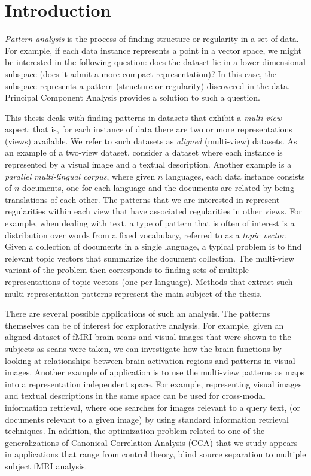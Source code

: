 %
\chapter{Introduction}

\emph{Pattern analysis} is the process of finding structure or regularity in a set of data. For example,
if each data instance represents a point in a vector space, we might be interested in the following question: does the dataset lie
in a lower dimensional subspace (does it admit a more compact representation)? In this case, the subspace represents a pattern (structure or regularity)
discovered in the data. Principal Component Analysis provides a solution to such a question.

This thesis deals with finding patterns in datasets that exhibit a \emph{multi-view} aspect: that is, for
each instance of data there are two or more representations (views) available. We refer to such datasets as
\emph{aligned} (multi-view) datasets. As an example of a two-view dataset, consider a dataset where each instance is represented by a visual image and
a textual description. Another example is a \emph{parallel multi-lingual corpus},
where given $n$ languages, each data instance consists of $n$ documents, one for each language and the documents are related by being
translations of each other. The patterns that we are interested in represent regularities within each view
that have associated regularities in other views. For example, when dealing with text, a type of pattern that is often of interest
is a distribution over words from a fixed vocabulary, referred to as a \emph{topic vector}. Given a collection of documents
in a single language, a typical problem is to find relevant topic vectors that summarize the document collection. The multi-view
variant of the problem then corresponds to finding sets of multiple representations of topic vectors (one per language).
Methods that extract such multi-representation patterns represent the main subject of the thesis.

There are several possible applications of such an analysis. The patterns themselves can be of interest
for explorative analysis. For example, given an aligned dataset of fMRI brain scans and visual images that were
shown to the subjects as scans were taken, we can investigate how the brain functions by looking at
relationships between brain activation regions and patterns in visual images.
Another example of application is to use the multi-view patterns as maps into a
representation independent space. For example, representing visual images and textual descriptions in the same
space can be used for cross-modal information retrieval, where one searches for images relevant to a query text,
(or documents relevant to a given image) by using standard information retrieval techniques. 
In addition, the optimization problem related to one of the generalizations of Canonical Correlation Analysis (CCA) that we
study appears in applications that range from control theory, blind source separation to multiple subject fMRI analysis.

